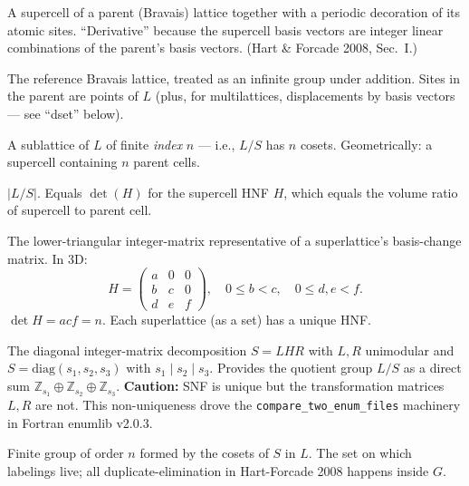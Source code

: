 \documentclass[11pt]{article}
\begin{document}
\begin{description}[leftmargin=2em, style=nextline]
\item[Derivative structure / derivative superstructure]
A supercell of a parent (Bravais) lattice together with a periodic
decoration of its atomic sites. ``Derivative'' because the supercell
basis vectors are integer linear combinations of the parent's basis
vectors. (Hart \& Forcade 2008, Sec.~I.)

\item[Parent lattice $L$]
The reference Bravais lattice, treated as an infinite group under
addition. Sites in the parent are points of $L$ (plus, for multilattices,
displacements by basis vectors --- see ``dset'' below).

\item[Superlattice / supercell $S$]
A sublattice of $L$ of finite \emph{index} $n$ --- i.e., $L/S$ has $n$
cosets. Geometrically: a supercell containing $n$ parent cells.

\item[Index $n$]
$|L/S|$. Equals $\det(H)$ for the supercell HNF $H$, which equals the
volume ratio of supercell to parent cell.

\item[HNF (Hermite Normal Form)]
The lower-triangular integer-matrix representative of a superlattice's
basis-change matrix. In 3D:
\[
H = \begin{pmatrix} a & 0 & 0 \\ b & c & 0 \\ d & e & f \end{pmatrix},
\quad 0 \le b < c, \quad 0 \le d, e < f.
\]
$\det H = acf = n$. Each superlattice (as a set) has a unique HNF.

\item[SNF (Smith Normal Form)]
The diagonal integer-matrix decomposition $S = LHR$ with $L, R$
unimodular and $S = \mathrm{diag}(s_1, s_2, s_3)$ with $s_1 \mid s_2 \mid s_3$.
Provides the quotient group $L/S$ as a direct sum
$\mathbb{Z}_{s_1} \oplus \mathbb{Z}_{s_2} \oplus \mathbb{Z}_{s_3}$.
\textbf{Caution:} SNF is unique but the transformation matrices $L, R$
are not. This non-uniqueness drove the
\texttt{compare\_two\_enum\_files} machinery in Fortran enumlib v2.0.3.

\item[Quotient group $G = L/S$]
Finite group of order $n$ formed by the cosets of $S$ in $L$. The set on
which labelings live; all duplicate-elimination in Hart-Forcade 2008
happens inside $G$.


\end{description}
\end{document}
